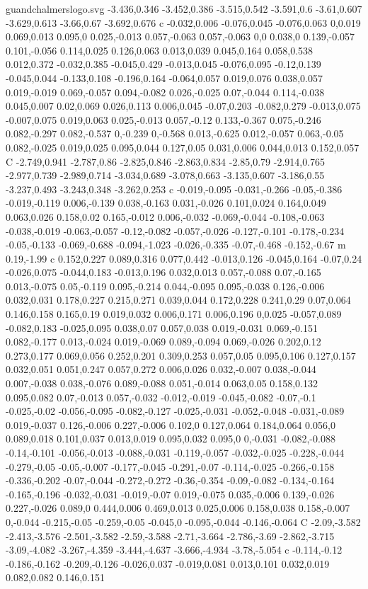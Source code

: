 \begin{filecontents}[noheader]{guandchalmerslogo.svg}
-3.436,0.346 -3.452,0.386 -3.515,0.542 -3.591,0.6 -3.61,0.607 -3.629,0.613 -3.66,0.67 -3.692,0.676 c -0.032,0.006 -0.076,0.045 -0.076,0.063 0,0.019 0.069,0.013 0.095,0 0.025,-0.013 0.057,-0.063 0.057,-0.063 0,0 0.038,0 0.139,-0.057 0.101,-0.056 0.114,0.025 0.126,0.063 0.013,0.039 0.045,0.164 0.058,0.538 0.012,0.372 -0.032,0.385 -0.045,0.429 -0.013,0.045 -0.076,0.095 -0.12,0.139 -0.045,0.044 -0.133,0.108 -0.196,0.164 -0.064,0.057 0.019,0.076 0.038,0.057 0.019,-0.019 0.069,-0.057 0.094,-0.082 0.026,-0.025 0.07,-0.044 0.114,-0.038 0.045,0.007 0.02,0.069 0.026,0.113 0.006,0.045 -0.07,0.203 -0.082,0.279 -0.013,0.075 -0.007,0.075 0.019,0.063 0.025,-0.013 0.057,-0.12 0.133,-0.367 0.075,-0.246 0.082,-0.297 0.082,-0.537 0,-0.239 0,-0.568 0.013,-0.625 0.012,-0.057 0.063,-0.05 0.082,-0.025 0.019,0.025 0.095,0.044 0.127,0.05 0.031,0.006 0.044,0.013 0.152,0.057 C -2.749,0.941 -2.787,0.86 -2.825,0.846 -2.863,0.834 -2.85,0.79 -2.914,0.765 -2.977,0.739 -2.989,0.714 -3.034,0.689 -3.078,0.663 -3.135,0.607 -3.186,0.55 -3.237,0.493 -3.243,0.348 -3.262,0.253 c -0.019,-0.095 -0.031,-0.266 -0.05,-0.386 -0.019,-0.119 0.006,-0.139 0.038,-0.163 0.031,-0.026 0.101,0.024 0.164,0.049 0.063,0.026 0.158,0.02 0.165,-0.012 0.006,-0.032 -0.069,-0.044 -0.108,-0.063 -0.038,-0.019 -0.063,-0.057 -0.12,-0.082 -0.057,-0.026 -0.127,-0.101 -0.178,-0.234 -0.05,-0.133 -0.069,-0.688 -0.094,-1.023 -0.026,-0.335 -0.07,-0.468 -0.152,-0.67 m 0.19,-1.99 c 0.152,0.227 0.089,0.316 0.077,0.442 -0.013,0.126 -0.045,0.164 -0.07,0.24 -0.026,0.075 -0.044,0.183 -0.013,0.196 0.032,0.013 0.057,-0.088 0.07,-0.165 0.013,-0.075 0.05,-0.119 0.095,-0.214 0.044,-0.095 0.095,-0.038 0.126,-0.006 0.032,0.031 0.178,0.227 0.215,0.271 0.039,0.044 0.172,0.228 0.241,0.29 0.07,0.064 0.146,0.158 0.165,0.19 0.019,0.032 0.006,0.171 0.006,0.196 0,0.025 -0.057,0.089 -0.082,0.183 -0.025,0.095 0.038,0.07 0.057,0.038 0.019,-0.031 0.069,-0.151 0.082,-0.177 0.013,-0.024 0.019,-0.069 0.089,-0.094 0.069,-0.026 0.202,0.12 0.273,0.177 0.069,0.056 0.252,0.201 0.309,0.253 0.057,0.05 0.095,0.106 0.127,0.157 0.032,0.051 0.051,0.247 0.057,0.272 0.006,0.026 0.032,-0.007 0.038,-0.044 0.007,-0.038 0.038,-0.076 0.089,-0.088 0.051,-0.014 0.063,0.05 0.158,0.132 0.095,0.082 0.07,-0.013 0.057,-0.032 -0.012,-0.019 -0.045,-0.082 -0.07,-0.1 -0.025,-0.02 -0.056,-0.095 -0.082,-0.127 -0.025,-0.031 -0.052,-0.048 -0.031,-0.089 0.019,-0.037 0.126,-0.006 0.227,-0.006 0.102,0 0.127,0.064 0.184,0.064 0.056,0 0.089,0.018 0.101,0.037 0.013,0.019 0.095,0.032 0.095,0 0,-0.031 -0.082,-0.088 -0.14,-0.101 -0.056,-0.013 -0.088,-0.031 -0.119,-0.057 -0.032,-0.025 -0.228,-0.044 -0.279,-0.05 -0.05,-0.007 -0.177,-0.045 -0.291,-0.07 -0.114,-0.025 -0.266,-0.158 -0.336,-0.202 -0.07,-0.044 -0.272,-0.272 -0.36,-0.354 -0.09,-0.082 -0.134,-0.164 -0.165,-0.196 -0.032,-0.031 -0.019,-0.07 0.019,-0.075 0.035,-0.006 0.139,-0.026 0.227,-0.026 0.089,0 0.444,0.006 0.469,0.013 0.025,0.006 0.158,0.038 0.158,-0.007 0,-0.044 -0.215,-0.05 -0.259,-0.05 -0.045,0 -0.095,-0.044 -0.146,-0.064 C -2.09,-3.582 -2.413,-3.576 -2.501,-3.582 -2.59,-3.588 -2.71,-3.664 -2.786,-3.69 -2.862,-3.715 -3.09,-4.082 -3.267,-4.359 -3.444,-4.637 -3.666,-4.934 -3.78,-5.054 c -0.114,-0.12 -0.186,-0.162 -0.209,-0.126 -0.026,0.037 -0.019,0.081 0.013,0.101 0.032,0.019 0.082,0.082 0.146,0.151 
\end{filecontents}
